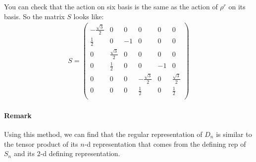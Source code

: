 \documentclass[]{ctexart}
\begin{document}
You can check that the action on six basis is the same as the action of $\rho^r$ on its basis. So the matrix $S$ looks like:
	\begin{equation*}
	\begin{aligned}
	S=\left(
	\begin{array}{cccccc}
	-\frac{\sqrt{3}}{2} & 0 & 0 & 0 & 0 & 0 \\
	\frac{1}{2} & 0 & -1 & 0 & 0 & 0 \\
	0 & \frac{\sqrt{3}}{2} & 0 & 0 & 0 & 0 \\
	0 & \frac{1}{2} & 0 & 0 & -1 & 0 \\
	0 & 0 & 0 & -\frac{\sqrt{3}}{2} & 0 & \frac{\sqrt{3}}{2} \\
	0 & 0 & 0 & \frac{1}{2} & 0 & \frac{1}{2} \\
	\end{array}
	\right)
	\end{aligned}
	\end{equation*}
	
\paragraph{Remark} Using this method, we can find that the regular representation of $D_n$ is similar to the tensor product of its $n$-d representation that comes from the defining rep of $S_n$ and its 2-d defining representation. 
	
\end{document}
